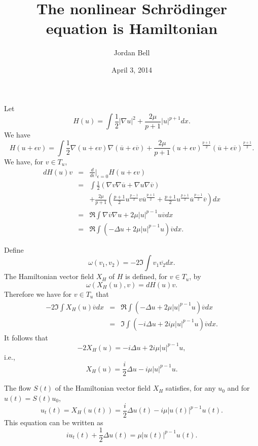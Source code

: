 \documentclass{article}
\begin{document}
\title{The nonlinear Schr\"odinger equation is Hamiltonian}
\author{Jordan Bell}
\date{April 3, 2014}
\maketitle

Let
\[
H(u)=\int \frac{1}{2}|\nabla u|^2+\frac{2\mu}{p+1}|u|^{p+1}dx.
\]
We have
\[
H(u+\epsilon v)=
\int \frac{1}{2} \nabla (u+\epsilon v) \nabla (\overline{u}+\epsilon \overline{v})+
\frac{2\mu}{p+1} (u+\epsilon v)^{\frac{p+1}{2}} (\overline{u}+\epsilon \overline{v})^{\frac{p+1}{2}}.
\]
We have, for $v \in T_u$,
\begin{eqnarray*}
dH(u)v&=&\frac{d}{d\epsilon}|_{\epsilon=0} H(u+\epsilon v)\\
&=&\int \frac{1}{2}\left( \nabla v \nabla \overline{u}+\nabla u \nabla \overline{v} \right)\\
&&+\frac{2\mu}{p+1}\left( \frac{p+1}{2} u^{\frac{p-1}{2}}v \overline{u}^{\frac{p+1}{2}}
+\frac{p+1}{2}u^{\frac{p+1}{2}} \overline{u}^{\frac{p-1}{2}}\overline{v} \right) dx\\
&=&\Re\int \nabla \overline{v} \nabla u+2\mu|u|^{p-1} u \overline{v} dx\\
&=&\Re \int \left(-\Delta u+2\mu|u|^{p-1} u\right) \overline{v} dx.
\end{eqnarray*}

Define
\[
\omega(v_1,v_2)=-2 \Im \int v_1 \overline{v_2} dx.
\]
The Hamiltonian vector field $X_H$ of $H$ is defined, for $v \in T_u$, by
\[
\omega(X_H(u),v)=dH(u)v.
\]
Therefore we have  for $v \in T_u$ that
\begin{eqnarray*}
-2\Im \int X_H(u) \overline{v} dx&=&\Re \int \left(-\Delta u+2\mu|u|^{p-1} u\right) \overline{v} dx\\
&=&\Im \int \left(-i\Delta u+2i\mu |u|^{p-1} u\right) \overline{v} dx.
\end{eqnarray*}
It follows that
\[
-2X_H(u)=-i\Delta u+2i\mu |u|^{p-1} u,
\]
i.e.,
\[
X_H(u)=\frac{i}{2}\Delta u-i\mu  |u|^{p-1} u.
\]

The flow $S(t)$ of the Hamiltonian vector field $X_H$ satisfies, for any $u_0$ and for $u(t)=S(t)u_0$,
\[
u_t(t) = X_H(u(t))=\frac{i}{2}\Delta u(t)-i\mu  |u(t)|^{p-1} u(t).
\] 
This equation can be written as
\[
iu_t(t)+\frac{1}{2} \Delta u(t)=\mu  |u(t)|^{p-1} u(t).
\]
\end{document}

